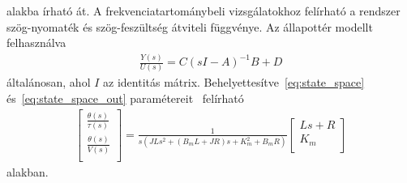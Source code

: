 alakba írható át. A frekvenciatartománybeli vizsgálatokhoz felírható a rendszer 
szög-nyomaték és szög-feszültség átviteli függvénye. Az állapottér modellt felhasználva
\begin{align}\label{eq:transfer_generic}
    \frac{Y(s)}{U(s)} = C\left(sI-A\right)^{-1}B+D
\end{align}
általánosan, ahol $I$ az identitás mátrix. Behelyettesítve~\ref{eq:state_space} és~\ref{eq:state_space_out}
paramétereit~\label{eq:transfer_generic} felírható
\begin{align}
    \begin{bmatrix}
        \frac{\theta(s)}{\tau(s)} \\ 
        \frac{\theta(s)}{V(s)} \\ 
    \end{bmatrix}
    =
    \frac{1}{s\left(JLs^2 + \left(B_m L + JR\right)s + K_m^2 + B_m R\right)}
    \begin{bmatrix}
        Ls + R \\ 
        K_m \\ 
    \end{bmatrix}
\end{align}
alakban.

